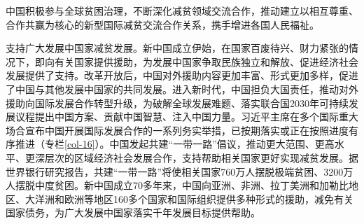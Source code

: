 \documentclass{ctexart}
\begin{document}
中国积极参与全球贫困治理，不断深化减贫领域交流合作，推动建立以相互尊重、合作共赢为核心的新型国际减贫交流合作关系，携手增进各国人民福祉。

支持广大发展中国家减贫发展。新中国成立伊始，在国家百废待兴、财力紧张的情况下，即向有关国家提供援助，为发展中国家争取民族独立和解放、促进经济社会发展提供了支持。改革开放后，中国对外援助内容更加丰富、形式更加多样，促进了中国与其他发展中国家的共同发展。进入新时代，中国担负大国责任，推动对外援助向国际发展合作转型升级，为破解全球发展难题、落实联合国2030年可持续发展议程提出中国方案、贡献中国智慧、注入中国力量。习近平主席在多个国际重大场合宣布中国开展国际发展合作的一系列务实举措，已按期落实或正在按照进度有序推进（专栏\ref{col-16}）。中国发起共建“一带一路”倡议，推动更大范围、更高水平、更深层次的区域经济社会发展合作，支持帮助相关国家更好实现减贫发展。据世界银行研究报告，共建“一带一路”将使相关国家760万人摆脱极端贫困、3200万人摆脱中度贫困。新中国成立70多年来，中国向亚洲、非洲、拉丁美洲和加勒比地区、大洋洲和欧洲等地区160多个国家和国际组织提供多种形式的援助，减免有关国家债务，为广大发展中国家落实千年发展目标提供帮助。
\end{document}
